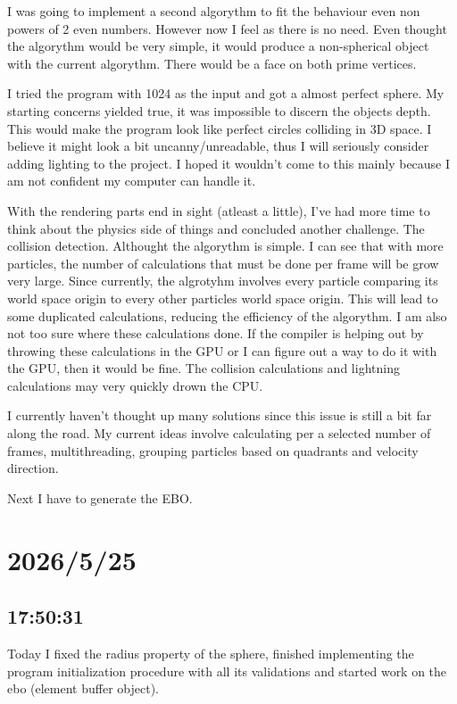\documentclass{article}
\begin{document}
I was going to implement a second algorythm to fit the behaviour even non powers of 2 even numbers. 
However now I feel as there is no need. Even thought the algorythm would be very simple, it would 
produce a non-spherical object with the current algorythm. There would be a face on both prime vertices.

I tried the program with 1024 as the input and got a almost perfect sphere. My starting concerns 
yielded true, it was impossible to discern the objects depth. This would make the program look like
perfect circles colliding in 3D space. I believe it might look a bit uncanny/unreadable, thus I will
seriously consider adding lighting to the project. I hoped it wouldn't come to this mainly because I
am not confident my computer can handle it.

With the rendering parts end in sight (atleast a little), I've had more time to think about the 
physics side of things and concluded another challenge. The collision detection. Althought the 
algorythm is simple. I can see that with more particles, the number of calculations that must be done
per frame will be grow very large. Since currently, the algrotyhm involves every particle comparing
its world space origin to every other particles world space origin. This will lead to some duplicated
calculations, reducing the efficiency of the algorythm. I am also not too sure where these calculations 
done. If the compiler is helping out by throwing these calculations in the GPU or I can figure out a way
to do it with the GPU, then it would be fine. The collision calculations and lightning calculations may 
very quickly drown the CPU.

I currently haven't thought up many solutions since this issue is still a bit far along the road.
My current ideas involve calculating per a selected number of frames, multithreading, grouping particles
based on quadrants and velocity direction.

Next I have to generate the EBO.

\section*{2026/5/25}
\subsection*{17:50:31}
Today I fixed the radius property of the sphere, finished implementing the program initialization 
procedure with all its validations and started work on the ebo (element buffer object).
\end{document}
